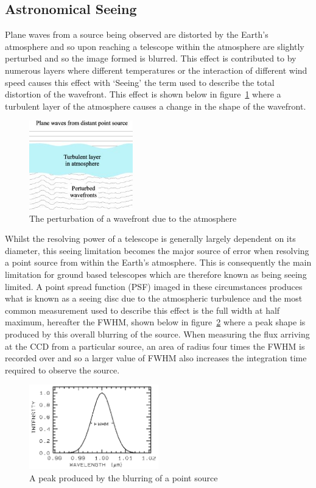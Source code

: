 	\subsection{Astronomical Seeing} %
	\label{sub:astronomical_seeing}
		Plane waves from a source being observed are distorted by the Earth’s atmosphere and so upon reaching a telescope within the atmosphere are slightly perturbed and so the image formed is blurred. This effect is contributed to by numerous layers where different temperatures or the interaction of different wind speed causes this effect with ‘Seeing’ the term used to describe the total distortion of the wavefront\cite[p.~188]{Diffraction_Limited_Imaging_Saha}. This effect is shown below in figure~\ref{fig:Seeing} where a turbulent layer of the atmosphere causes a change in the shape of the wavefront.
		\begin{figure}[ht]
			\centering
			\includegraphics[width=0.4\textwidth]{../Images/Seeing.png}
			\caption{The perturbation of a wavefront due to the atmosphere}\label{fig:Seeing}
		\end{figure}

		Whilst the resolving power of a telescope is generally largely dependent on its diameter, this seeing limitation becomes the major source of error when resolving a point source from within the Earth’s atmosphere. This is consequently the main limitation for ground based telescopes which are therefore known as being seeing limited. A point spread function (PSF) imaged in these circumstances produces what is known as a seeing disc due to the atmospheric turbulence and the most common measurement used to describe this effect is the full width at half maximum, hereafter the FWHM, shown below in figure~\ref{fig:FWHM} where a peak shape is produced by this overall blurring of the source. When measuring the flux arriving at the CCD from a particular source, an area of radius four times the FWHM is recorded over and so a larger value of FWHM also increases the integration time required to observe the source.
		\begin{figure}[ht]
			\centering
			\includegraphics[width=0.5\textwidth]{../Images/FWHM.png}
			\caption{A peak produced by the blurring of a point source}\label{fig:FWHM}
		\end{figure}

